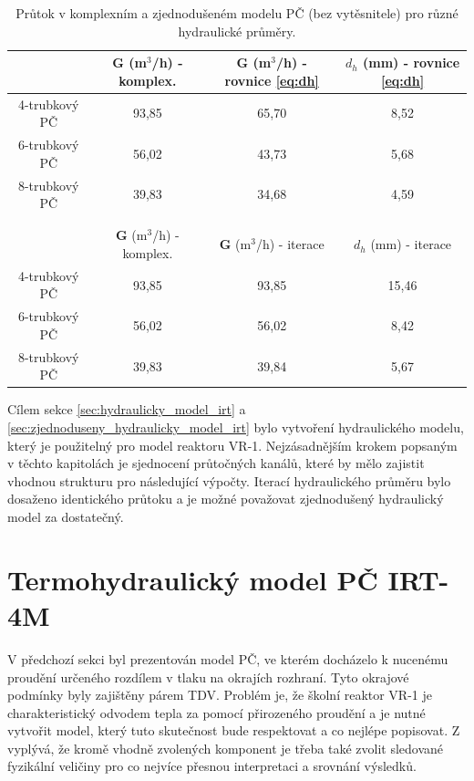 \begin{table}[H]
	\centering
	\caption{Průtok v komplexním a zjednodušeném modelu PČ (bez vytěsnitele) pro různé hydraulické průměry. }
	\label{tab:prutoky_it_srovnani}
	\begin{tabular}{cccc}
		\hline
		& \textbf{G} (m$^3$/h) - komplex. & \textbf{G} (m$^3$/h) - rovnice \ref{eq:dh} & $d_h$ (mm) - rovnice \ref{eq:dh} \\
		\hline \hline
		4-trubkový PČ & 93,85  & 65,70 & 8,52 \\
		6-trubkový PČ & 56,02  & 43,73 & 5,68 \\
		8-trubkový PČ & 39,83  & 34,68 & 4,59 \\
		\hline
		&&&\\
		&&&\\
		\hline 
		& \textbf{G} (m$^3$/h) - komplex.& \textbf{G} (m$^3$/h) - iterace & $d_h$ (mm) - iterace  \\
		\hline \hline
		4-trubkový PČ & 93,85  & 93,85 & 15,46 \\
		6-trubkový PČ & 56,02  & 56,02 & 8,42 \\
		8-trubkový PČ & 39,83  & 39,84 & 5,67 \\
		\hline 

	\end{tabular}

\end{table}	
Cílem sekce \ref{sec:hydraulicky_model_irt} a \ref{sec:zjednoduseny_hydraulicky_model_irt} bylo vytvoření hydraulického modelu, který je použitelný pro model reaktoru VR-1. Nejzásadnějším krokem popsaným v těchto kapitolách je sjednocení průtočných kanálů, které by mělo zajistit vhodnou strukturu pro následující výpočty. Iterací hydraulického průměru bylo dosaženo identického průtoku a je možné považovat zjednodušený hydraulický model za dostatečný.
\newpage

\section{Termohydraulický model PČ IRT-4M}
\label{sec:termohydraulicky_model}
V předchozí sekci byl prezentován model PČ, ve kterém docházelo k nucenému proudění určeného rozdílem v tlaku na okrajích rozhraní. Tyto okrajové podmínky byly zajištěny párem TDV. Problém je, že školní reaktor VR-1 je charakteristický odvodem tepla za pomocí přirozeného proudění a je nutné vytvořit model, který tuto skutečnost bude respektovat a co nejlépe popisovat. Z \cite{fejt} vyplývá, že kromě vhodně zvolených komponent je třeba také zvolit sledované fyzikální veličiny pro co nejvíce přesnou interpretaci a srovnání výsledků.

